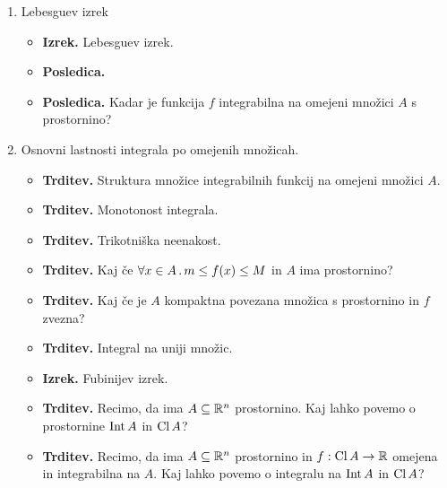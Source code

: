 \begin{enumerate}
    \item Lebesguev izrek
    \begin{itemize}
        \item \colorbox{blue!30}{\textbf{Izrek.}} Lebesguev izrek.
        \item \colorbox{orange!30}{\textbf{Posledica.}} \todo
        \item \colorbox{orange!30}{\textbf{Posledica.}} Kadar je funkcija \(f\) integrabilna na omejeni množici \(A\) s prostornino?
    \end{itemize}

    \item Osnovni lastnosti integrala po omejenih množicah.
    \begin{itemize}
        \item \colorbox{blue!30}{\textbf{Trditev.}} Struktura množice integrabilnih funkcij na omejeni množici \(A\).
        \item \colorbox{blue!30}{\textbf{Trditev.}} Monotonost integrala.
        \item \colorbox{blue!30}{\textbf{Trditev.}} Trikotniška neenakost.
        \item \colorbox{blue!30}{\textbf{Trditev.}} Kaj če \(\forall x \in A \,.\, m \leq f(x) \leq M\) in \(A\) ima prostornino?
        \item \colorbox{blue!30}{\textbf{Trditev.}} Kaj če je \(A\) kompaktna povezana množica s prostornino in \(f\) zvezna?
        \item \colorbox{blue!30}{\textbf{Trditev.}} Integral na uniji množic.
        \item \colorbox{blue!30}{\textbf{Izrek.}} Fubinijev izrek.
        \item \colorbox{blue!30}{\textbf{Trditev.}} Recimo, da ima \(A \subseteq \mathbb{R}^n\) prostornino. Kaj lahko povemo o prostornine \(\operatorname{Int} A\) in \(\operatorname{Cl} A\)?
        \item \colorbox{blue!30}{\textbf{Trditev.}} Recimo, da ima \(A \subseteq \mathbb{R}^n\) prostornino in \(f: \operatorname{Cl} A \to \mathbb{R}\) omejena in integrabilna na \(A\). Kaj lahko povemo o integralu na \(\operatorname{Int} A\) in \(\operatorname{Cl} A\)?
    \end{itemize}
\end{enumerate}